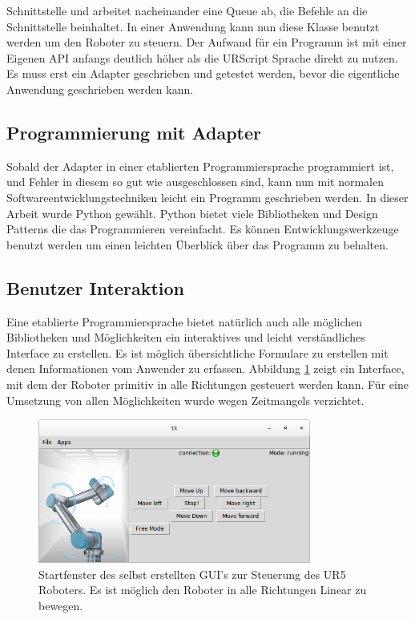 Schnittstelle und arbeitet nacheinander eine \ac{Queue} ab, die Befehle an die Schnittstelle beinhaltet.
In einer Anwendung kann nun diese Klasse benutzt werden um den Roboter zu steuern.
Der Aufwand für ein Programm ist mit einer Eigenen API anfangs deutlich höher als die URScript Sprache direkt zu nutzen. Es muss erst ein Adapter geschrieben und getestet werden, bevor die eigentliche Anwendung geschrieben werden kann. 

\subsection{Programmierung mit Adapter}
\label{programmierung_mit_hoerherer_schicht}

Sobald der Adapter in einer etablierten Programmiersprache programmiert ist, und Fehler in diesem so gut wie ausgeschlossen sind, kann nun mit normalen Softwareentwicklungstechniken leicht ein Programm geschrieben werden. In dieser Arbeit wurde Python gewählt. Python bietet viele Bibliotheken und Design Patterns die das Programmieren vereinfacht. Es können Entwicklungswerkzeuge benutzt werden um einen leichten Überblick über das Programm zu behalten.

\subsection{Benutzer Interaktion}
\label{user_interaktion_mit_hoerherer_schicht}

Eine etablierte Programmiersprache bietet natürlich auch alle möglichen Bibliotheken und Möglichkeiten ein interaktives und leicht verständliches Interface zu erstellen. Es ist möglich übersichtliche Formulare zu erstellen mit denen Informationen vom Anwender zu erfassen. Abbildung \ref{fig:hda_urcontrol_gui} zeigt ein Interface, mit dem der Roboter primitiv in alle Richtungen gesteuert werden kann. Für eine Umsetzung von allen Möglichkeiten wurde wegen Zeitmangels verzichtet.

\begin{figure}[H]
  \centering
    \includegraphics[width=0.8\textwidth]{pic/hda_urcontrol_gui.png}
      \caption[Selbsterstelltes GUI zur Steuerung des UR5 Roboters]{Startfenster des selbst erstellten GUI's zur Steuerung des UR5 Roboters. Es ist möglich den Roboter in alle Richtungen Linear zu bewegen.}
      \label{fig:hda_urcontrol_gui}
\end{figure}

